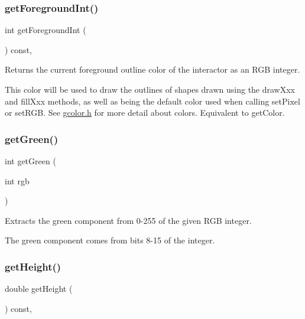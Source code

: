 \subsubsection{\texorpdfstring{get\+Foreground\+Int()}{getForegroundInt()}\hspace{0.1cm}{\footnotesize\ttfamily [2/2]}}
{\footnotesize\ttfamily int get\+Foreground\+Int (\begin{DoxyParamCaption}{ }\end{DoxyParamCaption}) const\hspace{0.3cm}{\ttfamily [virtual]}, {\ttfamily [inherited]}}



Returns the current foreground outline color of the interactor as an R\+GB integer. 

This color will be used to draw the outlines of shapes drawn using the draw\+Xxx and fill\+Xxx methods, as well as being the default color used when calling set\+Pixel or set\+R\+GB. See \mbox{\hyperlink{gcolor_8h_source}{gcolor.\+h}} for more detail about colors. Equivalent to get\+Color. \mbox{\label{classsgl_1_1GCanvas_ac307c120ba81c4531d46924ba3358382}} 
\subsubsection{\texorpdfstring{get\+Green()}{getGreen()}}
{\footnotesize\ttfamily int get\+Green (\begin{DoxyParamCaption}\item[{int}]{rgb }\end{DoxyParamCaption})\hspace{0.3cm}{\ttfamily [static]}}



Extracts the green component from 0-\/255 of the given R\+GB integer. 

The green component comes from bits 8-\/15 of the integer. \mbox{\label{classsgl_1_1GInteractor_a1e7e353362434072875264cf95629f99}} 
\subsubsection{\texorpdfstring{get\+Height()}{getHeight()}}
{\footnotesize\ttfamily double get\+Height (\begin{DoxyParamCaption}{ }\end{DoxyParamCaption}) const\hspace{0.3cm}{\ttfamily [virtual]}, {\ttfamily [inherited]}}



